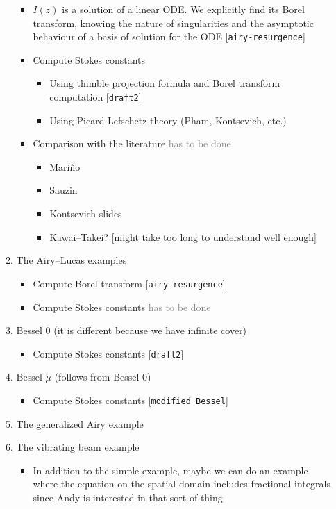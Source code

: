 \documentclass{article}
\theoremstyle{definition}
\begin{document}
\begin{enumerate}
\begin{enumerate}
\begin{itemize}
\item $I(z)$ is a solution of a linear ODE. We explicitly find its Borel transform, knowing the nature of singularities and the asymptotic behaviour of a basis of solution for the ODE  [{\tt airy-resurgence}]
\item Compute Stokes constants
\begin{itemize}
\item Using thimble projection formula and Borel transform computation [{\tt draft2}]
\item Using Picard-Lefschetz theory (Pham, Kontsevich, etc.)
\end{itemize}
\item Comparison with the literature \textcolor{gray}{has to be done}
\begin{itemize}
\item Mari\~{n}o
\item Sauzin
\item Kontsevich slides
\item Kawai--Takei? [might take too long to understand well enough]
\end{itemize}
\end{itemize}
\item The Airy--Lucas examples
\begin{itemize}
\item Compute Borel transform [{\tt airy-resurgence}]
\item Compute Stokes constants \textcolor{gray}{has to be done}
\end{itemize}
\item Bessel 0 (it is different because we have infinite cover)
\begin{itemize}
\item Compute Stokes constants [{\tt draft2}]
\end{itemize}
\item Bessel $\mu$ (follows from Bessel 0)
\begin{itemize}
\item Compute Stokes constants [{\tt modified Bessel}]
\end{itemize}
\item The generalized Airy example
\item The vibrating beam example
\begin{itemize}
\item In addition to the simple example, maybe we can do an example where the equation on the spatial domain includes fractional integrals since Andy is interested in that sort of thing
\end{itemize}
\end{enumerate}
\end{enumerate}
\end{document}
